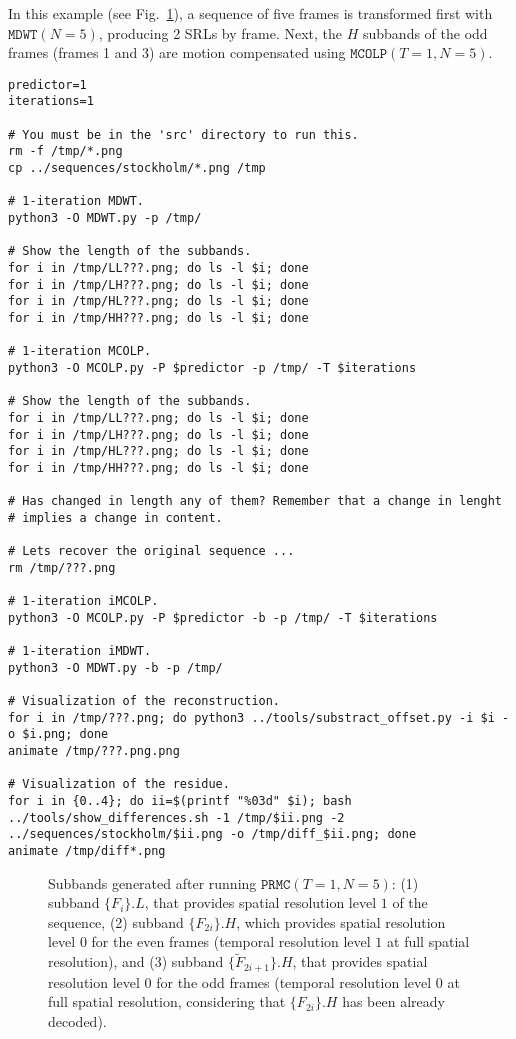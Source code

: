 In this example (see Fig.~\ref{fig:1xPRMC1}), a sequence of five
frames is transformed first with $\mathtt{MDWT}(N=5)$, producing 2
SRLs by frame. Next, the $H$ subbands of the odd frames (frames 1 and
3) are motion compensated using $\mathtt{MCOLP}(T=1, N=5)$.

\begin{verbatim}
predictor=1
iterations=1

# You must be in the 'src' directory to run this.
rm -f /tmp/*.png
cp ../sequences/stockholm/*.png /tmp

# 1-iteration MDWT.
python3 -O MDWT.py -p /tmp/

# Show the length of the subbands.
for i in /tmp/LL???.png; do ls -l $i; done
for i in /tmp/LH???.png; do ls -l $i; done
for i in /tmp/HL???.png; do ls -l $i; done
for i in /tmp/HH???.png; do ls -l $i; done

# 1-iteration MCOLP.
python3 -O MCOLP.py -P $predictor -p /tmp/ -T $iterations

# Show the length of the subbands.
for i in /tmp/LL???.png; do ls -l $i; done
for i in /tmp/LH???.png; do ls -l $i; done
for i in /tmp/HL???.png; do ls -l $i; done
for i in /tmp/HH???.png; do ls -l $i; done

# Has changed in length any of them? Remember that a change in lenght
# implies a change in content.

# Lets recover the original sequence ...
rm /tmp/???.png

# 1-iteration iMCOLP.
python3 -O MCOLP.py -P $predictor -b -p /tmp/ -T $iterations

# 1-iteration iMDWT.
python3 -O MDWT.py -b -p /tmp/

# Visualization of the reconstruction.
for i in /tmp/???.png; do python3 ../tools/substract_offset.py -i $i -o $i.png; done
animate /tmp/???.png.png

# Visualization of the residue.
for i in {0..4}; do ii=$(printf "%03d" $i); bash ../tools/show_differences.sh -1 /tmp/$ii.png -2 ../sequences/stockholm/$ii.png -o /tmp/diff_$ii.png; done
animate /tmp/diff*.png
\end{verbatim}

\begin{figure}
  \centering
  \caption{Subbands generated after running $\mathtt{PRMC}(T=1, N=5)$:
    (1) subband $\{F_i\}.L$, that provides spatial resolution level
    $1$ of the sequence, (2) subband $\{F_{2i}\}.H$, which provides
    spatial resolution level $0$ for the even frames (temporal
    resolution level $1$ at full spatial resolution), and (3) subband
    $\{{\tilde F}_{2i+1}\}.H$, that provides spatial resolution level
    $0$ for the odd frames (temporal resolution level $0$ at full
    spatial resolution, considering that $\{F_{2i}\}.H$ has been
    already decoded).}
  \label{fig:1xPRMC1}
\end{figure}

